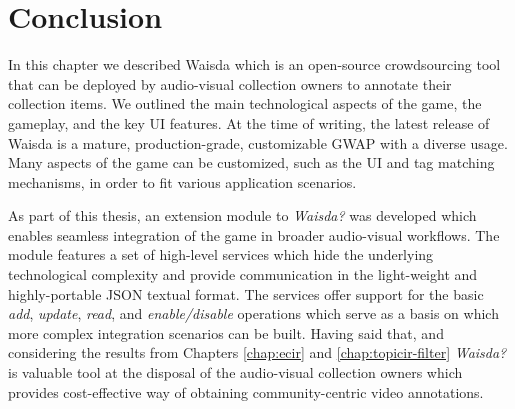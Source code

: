 \section{Conclusion}
In this chapter we described Waisda which is an open-source crowdsourcing tool that can be deployed by audio-visual collection owners to annotate their collection items. We outlined the main technological aspects of the game, the gameplay, and the key UI features. At the time of writing, the latest release of Waisda is a mature, production-grade, customizable GWAP with a diverse usage. Many aspects of the game can be customized, such as the UI and tag matching mechanisms, in order to fit various application scenarios. 

As part of this thesis, an extension module to \textit{Waisda?} was developed which enables seamless integration of the game in broader audio-visual workflows. The module features a set of high-level services which hide the underlying technological complexity  and provide communication in the light-weight and highly-portable JSON textual format. The services offer support for the basic \textit{add}, \textit{update}, \textit{read}, and \textit{enable/disable} operations which serve as a basis on which more complex integration scenarios can be built. Having said that, and considering the results from Chapters \ref{chap:ecir} and \ref{chap:topicir-filter} \textit{Waisda?} is valuable tool at the disposal of the audio-visual collection owners which provides cost-effective way of obtaining community-centric video annotations.